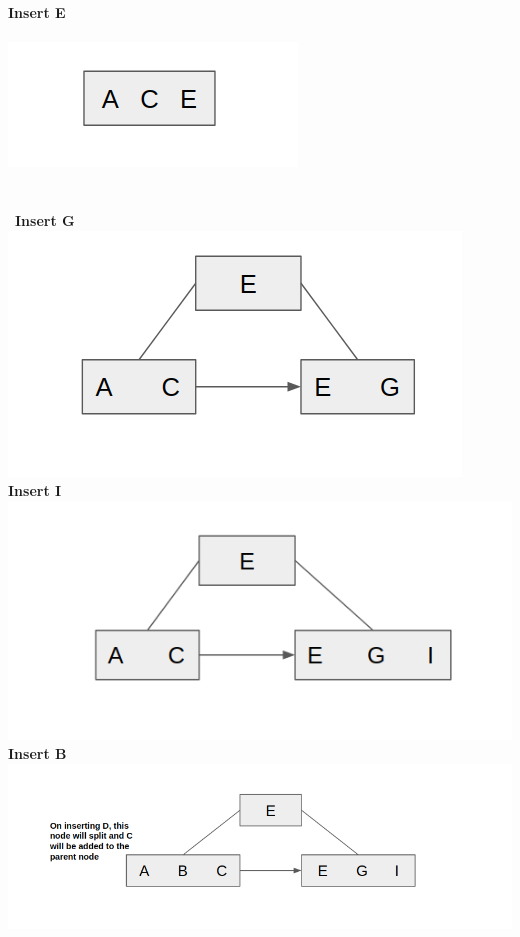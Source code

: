 \documentclass[12pt]{article}
\begin{document}
\begin{enumerate}
\begin{enumerate}
\textbf{Insert E}\\\\
\includegraphics[scale=0.6]{q33.png}\\\\\\\
\textbf{Insert G}\\
\includegraphics[scale=0.5]{q34.png}\\
\textbf{Insert I}\\
\includegraphics[scale=0.5]{q35.png}\\
\textbf{Insert B}\\
\includegraphics[scale=0.5]{q36.png}\\

\end{enumerate}
\end{enumerate}
\end{document}
